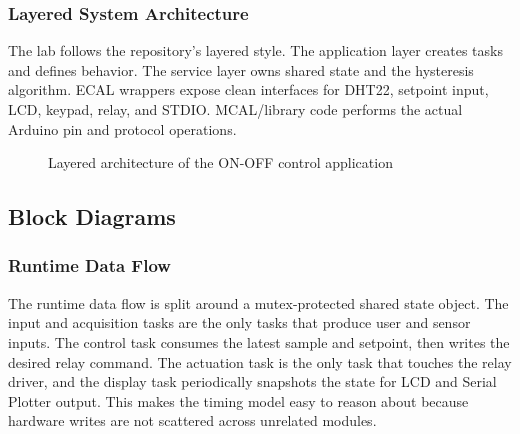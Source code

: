 \subsubsection{Layered System Architecture}

The lab follows the repository's layered style. The application layer creates tasks and defines behavior. The service layer owns shared state and the hysteresis algorithm. ECAL wrappers expose clean interfaces for DHT22, setpoint input, LCD, keypad, relay, and STDIO. MCAL/library code performs the actual Arduino pin and protocol operations.

\begin{figure}[H]
\centering
{}
\caption{Layered architecture of the ON-OFF control application}
\label{fig:layered_architecture}
\end{figure}

\subsection{Block Diagrams}

\subsubsection{Runtime Data Flow}

The runtime data flow is split around a mutex-protected shared state object. The input and acquisition tasks are the only tasks that produce user and sensor inputs. The control task consumes the latest sample and setpoint, then writes the desired relay command. The actuation task is the only task that touches the relay driver, and the display task periodically snapshots the state for LCD and Serial Plotter output. This makes the timing model easy to reason about because hardware writes are not scattered across unrelated modules.

